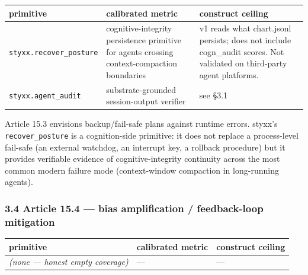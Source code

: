 \documentclass[
]{article}
\newcounter{none} %
\begin{document}
{\def\LTcaptype{none} %
\begin{longtable}[]{@{}
  >{\raggedright\arraybackslash}p{}
  >{\raggedright\arraybackslash}p{}
  >{\raggedright\arraybackslash}p{}@{}}
\toprule\noalign{}
\begin{minipage}[b]{\linewidth}\raggedright
primitive
\end{minipage} & \begin{minipage}[b]{\linewidth}\raggedright
calibrated metric
\end{minipage} & \begin{minipage}[b]{\linewidth}\raggedright
construct ceiling
\end{minipage} \\
\midrule\noalign{}
\endhead
\bottomrule\noalign{}
\endlastfoot
\texttt{styxx.recover\_posture} & cognitive-integrity persistence
primitive for agents crossing context-compaction boundaries & v1 reads
what chart.jsonl persists; does not include cogn\_audit scores. Not
validated on third-party agent platforms. \\
\texttt{styxx.agent\_audit} & substrate-grounded session-output verifier
& see §3.1 \\
\end{longtable}
}

Article 15.3 envisions backup/fail-safe plans against runtime errors.
styxx's \texttt{recover\_posture} is a cognition-side primitive: it does
not replace a process-level fail-safe (an external watchdog, an
interrupt key, a rollback procedure) but it provides verifiable evidence
of cognitive-integrity continuity across the most common modern failure
mode (context-window compaction in long-running agents).

\subsubsection{3.4 Article 15.4 --- bias amplification / feedback-loop
mitigation}\label{article-15.4-bias-amplification-feedback-loop-mitigation}

{\def\LTcaptype{none} %
\begin{longtable}[]{@{}lll@{}}
\toprule\noalign{}
primitive & calibrated metric & construct ceiling \\
\midrule\noalign{}
\endhead
\bottomrule\noalign{}
\endlastfoot
\emph{(none --- honest empty coverage)} & --- & --- \\
\end{longtable}
}
\end{document}
